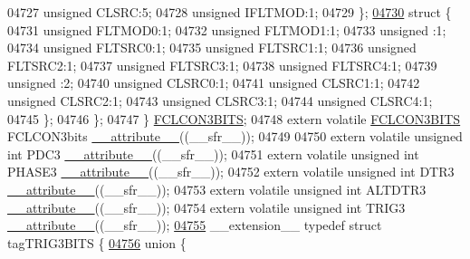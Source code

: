\begin{DoxyCode}
04727       \textcolor{keywordtype}{unsigned} CLSRC:5;
04728       \textcolor{keywordtype}{unsigned} IFLTMOD:1;
04729     \};
\hypertarget{a00015_source_l04730}{}\hyperlink{a00015}{04730}     \textcolor{keyword}{struct }\{
04731       \textcolor{keywordtype}{unsigned} FLTMOD0:1;
04732       \textcolor{keywordtype}{unsigned} FLTMOD1:1;
04733       \textcolor{keywordtype}{unsigned} :1;
04734       \textcolor{keywordtype}{unsigned} FLTSRC0:1;
04735       \textcolor{keywordtype}{unsigned} FLTSRC1:1;
04736       \textcolor{keywordtype}{unsigned} FLTSRC2:1;
04737       \textcolor{keywordtype}{unsigned} FLTSRC3:1;
04738       \textcolor{keywordtype}{unsigned} FLTSRC4:1;
04739       \textcolor{keywordtype}{unsigned} :2;
04740       \textcolor{keywordtype}{unsigned} CLSRC0:1;
04741       \textcolor{keywordtype}{unsigned} CLSRC1:1;
04742       \textcolor{keywordtype}{unsigned} CLSRC2:1;
04743       \textcolor{keywordtype}{unsigned} CLSRC3:1;
04744       \textcolor{keywordtype}{unsigned} CLSRC4:1;
04745     \};
04746   \};
04747 \} \hyperlink{a00014_d9/d10/a00449}{FCLCON3BITS};
04748 \textcolor{keyword}{extern} \textcolor{keyword}{volatile} \hyperlink{a00014_d9/d10/a00449}{FCLCON3BITS} FCLCON3bits \hyperlink{a00015_a493c46f03454991ccc5aa7a6e1dfb2a7}{\_\_attribute\_\_}((\_\_sfr\_\_));
04749 
04750 \textcolor{keyword}{extern} \textcolor{keyword}{volatile} \textcolor{keywordtype}{unsigned} \textcolor{keywordtype}{int}  PDC3 \hyperlink{a00015_a493c46f03454991ccc5aa7a6e1dfb2a7}{\_\_attribute\_\_}((\_\_sfr\_\_));
04751 \textcolor{keyword}{extern} \textcolor{keyword}{volatile} \textcolor{keywordtype}{unsigned} \textcolor{keywordtype}{int}  PHASE3 \hyperlink{a00015_a493c46f03454991ccc5aa7a6e1dfb2a7}{\_\_attribute\_\_}((\_\_sfr\_\_));
04752 \textcolor{keyword}{extern} \textcolor{keyword}{volatile} \textcolor{keywordtype}{unsigned} \textcolor{keywordtype}{int}  DTR3 \hyperlink{a00015_a493c46f03454991ccc5aa7a6e1dfb2a7}{\_\_attribute\_\_}((\_\_sfr\_\_));
04753 \textcolor{keyword}{extern} \textcolor{keyword}{volatile} \textcolor{keywordtype}{unsigned} \textcolor{keywordtype}{int}  ALTDTR3 \hyperlink{a00015_a493c46f03454991ccc5aa7a6e1dfb2a7}{\_\_attribute\_\_}((\_\_sfr\_\_));
04754 \textcolor{keyword}{extern} \textcolor{keyword}{volatile} \textcolor{keywordtype}{unsigned} \textcolor{keywordtype}{int}  TRIG3 \hyperlink{a00015_a493c46f03454991ccc5aa7a6e1dfb2a7}{\_\_attribute\_\_}((\_\_sfr\_\_));
\hypertarget{a00015_source_l04755}{}\hyperlink{a00014}{04755} \_\_extension\_\_ \textcolor{keyword}{typedef} \textcolor{keyword}{struct }tagTRIG3BITS \{
\hypertarget{a00015_source_l04756}{}\hyperlink{a00015}{04756}   \textcolor{keyword}{union }\{

\end{DoxyCode}
